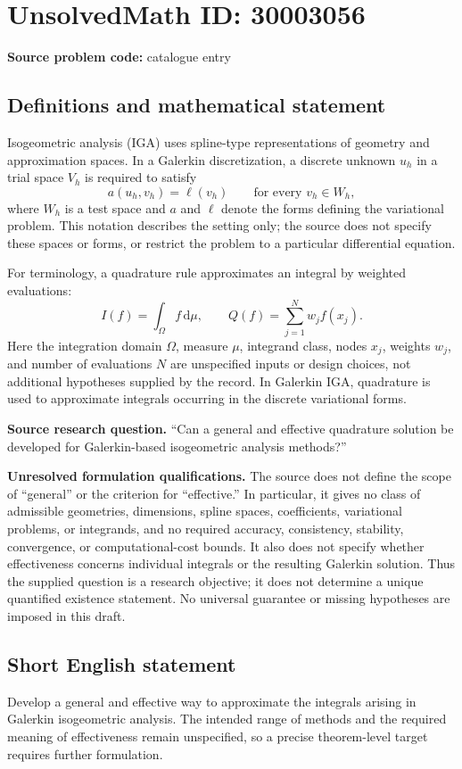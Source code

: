 \documentclass[11pt]{article}
\begin{document}
\section*{UnsolvedMath ID: 30003056}
\textbf{Source problem code:} catalogue entry
\subsection{Definitions and mathematical statement}
Isogeometric analysis (IGA) uses spline-type representations of geometry and approximation spaces. In a Galerkin discretization, a discrete unknown \(u_h\) in a trial space \(V_h\) is required to satisfy
\[
 a(u_h,v_h)=\ell(v_h)\qquad\text{for every }v_h\in W_h,
\]
where \(W_h\) is a test space and \(a\) and \(\ell\) denote the forms defining the variational problem. This notation describes the setting only; the source does not specify these spaces or forms, or restrict the problem to a particular differential equation.

For terminology, a quadrature rule approximates an integral by weighted evaluations:
\[
 I(f)=\int_{\Omega}f\,\mathrm d\mu,
 \qquad
 Q(f)=\sum_{j=1}^{N}w_j f(x_j).
\]
Here the integration domain \(\Omega\), measure \(\mu\), integrand class, nodes \(x_j\), weights \(w_j\), and number of evaluations \(N\) are unspecified inputs or design choices, not additional hypotheses supplied by the record. In Galerkin IGA, quadrature is used to approximate integrals occurring in the discrete variational forms.

\textbf{Source research question.} ``Can a general and effective quadrature solution be developed for Galerkin-based isogeometric analysis methods?''

\textbf{Unresolved formulation qualifications.} The source does not define the scope of ``general'' or the criterion for ``effective.'' In particular, it gives no class of admissible geometries, dimensions, spline spaces, coefficients, variational problems, or integrands, and no required accuracy, consistency, stability, convergence, or computational-cost bounds. It also does not specify whether effectiveness concerns individual integrals or the resulting Galerkin solution. Thus the supplied question is a research objective; it does not determine a unique quantified existence statement. No universal guarantee or missing hypotheses are imposed in this draft.
\subsection{Short English statement}
Develop a general and effective way to approximate the integrals arising in Galerkin isogeometric analysis. The intended range of methods and the required meaning of effectiveness remain unspecified, so a precise theorem-level target requires further formulation.
\end{document}
